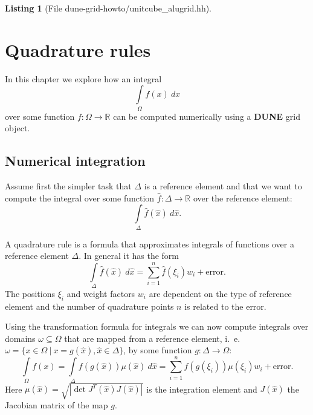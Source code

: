 \documentclass[11pt,a4paper,headinclude,footinclude,DIV16,headings=normal]{scrreprt}
\newcommand{\Dune}{{\sffamily\bfseries DUNE}\xspace}
\newtheorem{lst}{Listing}
\begin{document}
\begin{lst}[File dune-grid-howto/unitcube\_alugrid.hh] \mbox{}
\nopagebreak

\end{lst}






\chapter{Quadrature rules}
\label{sec:quadrature}

In this chapter we explore how an integral $$\int\limits_{\Omega} f(x)\ dx$$
over some function $f:\Omega\to\mathbb{R}$ can be computed numerically
using a \Dune{} grid object.

\section{Numerical integration}

Assume first the simpler task that $\Delta$ is a reference element
and that we want to
compute the integral over some function $\hat{f}:\Delta\to\mathbb{R}$
over the reference element:$$\int\limits_{\Delta} \hat{f}(\hat{x})\ d\hat{x}.$$


A quadrature rule is a formula that approximates integrals of
functions over a reference element $\Delta$. In general it has the form
$$\int\limits_{\Delta} \hat{f}(\hat{x})\ d\hat{x} = \sum_{i=1}^n
\hat{f}(\xi_i) w_i + \text{error}.$$
The positions $\xi_i$ and weight factors $w_i$ are dependent on the
type of reference element and the number of quadrature points $n$ is
related to the error.

Using the transformation formula for integrals we can now compute
integrals over domains $\omega\subseteq\Omega$ that are mapped from a
reference element, i.~e.~$\omega=\{x\in\Omega\ |\
x=g(\hat{x}), \hat{x}\in\Delta\}$, by some function $g:\Delta\to\Omega$:
\begin{equation}
\int\limits_{\Omega} f(x) = \int\limits_{\Delta} f(g(\hat{x}))\mu(\hat{x})\
d\hat{x} = \sum_{i=1}^n f(g(\xi_i))\mu(\xi_i)w_i + \text{error}.
\label{Eq:IntegrateEntity}
\end{equation}
Here $\mu(\hat{x}) = \sqrt{|\det J^T(\hat{x})J(\hat{x})|}$ is the
integration element and $J(\hat{x})$ the Jacobian matrix of the map $g$.
\end{document}
